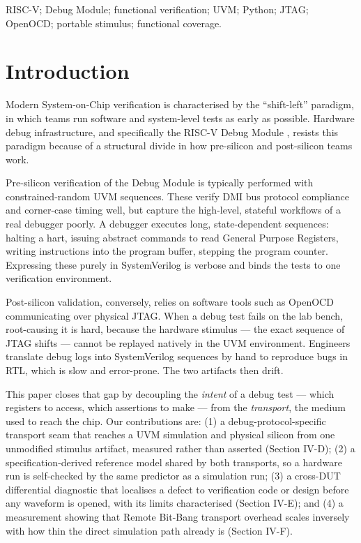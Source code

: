 \documentclass[conference]{IEEEtran}
\begin{document}
\begin{IEEEkeywords}
RISC-V; Debug Module; functional verification; UVM; Python; JTAG; OpenOCD; portable stimulus; functional coverage.
\end{IEEEkeywords}

\section{Introduction}
Modern System-on-Chip verification is characterised by the ``shift-left'' paradigm, in which teams run software and system-level tests as early as possible. Hardware debug infrastructure, and specifically the RISC-V Debug Module \cite{b1}, resists this paradigm because of a structural divide in how pre-silicon and post-silicon teams work.

Pre-silicon verification of the Debug Module is typically performed with constrained-random UVM sequences. These verify DMI bus protocol compliance and corner-case timing well, but capture the high-level, stateful workflows of a real debugger poorly. A debugger executes long, state-dependent sequences: halting a hart, issuing abstract commands to read General Purpose Registers, writing instructions into the program buffer, stepping the program counter. Expressing these purely in SystemVerilog is verbose and binds the tests to one verification environment.

Post-silicon validation, conversely, relies on software tools such as OpenOCD communicating over physical JTAG. When a debug test fails on the lab bench, root-causing it is hard, because the hardware stimulus --- the exact sequence of JTAG shifts --- cannot be replayed natively in the UVM environment. Engineers translate debug logs into SystemVerilog sequences by hand to reproduce bugs in RTL, which is slow and error-prone. The two artifacts then drift.

This paper closes that gap by decoupling the \textit{intent} of a debug test --- which registers to access, which assertions to make --- from the \textit{transport}, the medium used to reach the chip. Our contributions are: (1) a debug-protocol-specific transport seam that reaches a UVM simulation and physical silicon from one unmodified stimulus artifact, measured rather than asserted (Section IV-D); (2) a specification-derived reference model shared by both transports, so a hardware run is self-checked by the same predictor as a simulation run; (3) a cross-DUT differential diagnostic that localises a defect to verification code or design before any waveform is opened, with its limits characterised (Section IV-E); and (4) a measurement showing that Remote Bit-Bang transport overhead scales inversely with how thin the direct simulation path already is (Section IV-F).
\end{document}
